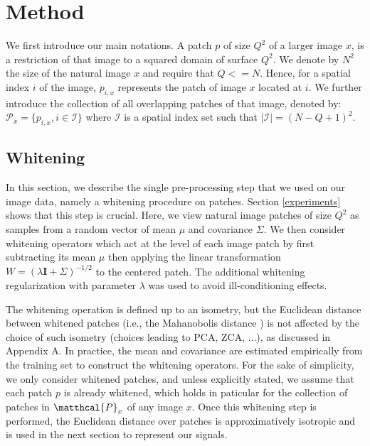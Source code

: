 \documentclass{article}
\begin{document}
\section{Method}
\label{method}
We first introduce our main notations. A patch $p$ of size $Q^2$ of a larger image $x$, is a  restriction of that image to a squared domain of surface $Q^2$. We denote by $N^2$ the size of the natural image $x$ and require that $Q<=N$. Hence, for a spatial index $i$ of the image,  $p_{i,x}$ represents the patch of image $x$ located at $i$.
We further introduce the collection of all overlapping patches of that image, denoted by: $\mathcal{P}_x=\{p_{i,x},i\in\mathcal{I}\}$ where $\mathcal{I}$ is a spatial index set such that $|\mathcal{I}|=(N-Q+1)
^2$. 
\vspace{-0.1cm}
\subsection{Whitening}
\vspace{-0.1cm}
In this section, we describe the single pre-processing step that we used on our image data, namely a whitening procedure on patches. Section \ref{experiments} shows that this step is crucial. 
Here, we view  natural image patches of size $Q^2$ as samples from a random vector of mean $\mu$ and covariance   $\Sigma$. 
We then consider  whitening operators which act at the level of each image patch by first subtracting its mean $\mu$ then applying the linear transformation $W=(\lambda \mathbf{I}+\Sigma
)^{-1/2}$ to the centered patch. The additional whitening regularization with parameter $\lambda$ was used to avoid ill-conditioning effects.

The whitening operation is defined up to an isometry, but the Euclidean distance between whitened patches (i.e., the Mahanobolis distance \citep{chandra1936generalised}) is not affected by the choice of such isometry (choices leading to PCA, ZCA, ...), as discussed in Appendix A.
In practice,  the mean and covariance are estimated empirically from the training set to construct the whitening operators. For the sake of simplicity, we  only  consider whitened patches, and unless explicitly stated, we assume that each patch $p$ is already whitened, which holds in paticular for the collection of patches in $\matthcal{P}_x$ of any image $x$. 
Once this whitening step is performed, the Euclidean distance over patches is approximatively isotropic and is used in the next section to represent our signals.
\end{document}
